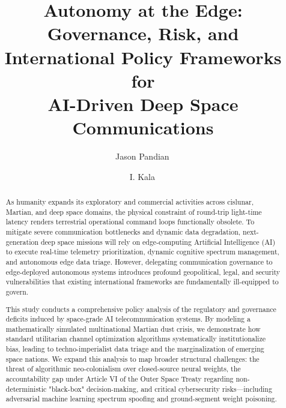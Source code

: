\documentclass[final,5p,times,twocolumn]{elsarticle}
\begin{document}
\begin{frontmatter}

\title{Autonomy at the Edge: Governance, Risk, and International Policy Frameworks for\\ AI-Driven Deep Space Communications}

\author[1]{Jason Pandian\,}

\author[2]{I. Kala\,}

\begin{abstract}
As humanity expands its exploratory and commercial activities across cislunar, Martian, and deep space domains, the physical constraint of round-trip light-time latency renders terrestrial operational command loops functionally obsolete. To mitigate severe communication bottlenecks and dynamic data degradation, next-generation deep space missions will rely on edge-computing Artificial Intelligence (AI) to execute real-time telemetry prioritization, dynamic cognitive spectrum management, and autonomous edge data triage. However, delegating communication governance to edge-deployed autonomous systems introduces profound geopolitical, legal, and security vulnerabilities that existing international frameworks are fundamentally ill-equipped to govern.

This study conducts a comprehensive policy analysis of the regulatory and governance deficits induced by space-grade AI telecommunication systems. By modeling a mathematically simulated multinational Martian dust crisis, we demonstrate how standard utilitarian channel optimization algorithms systematically institutionalize bias, leading to techno-imperialist data triage and the marginalization of emerging space nations. We expand this analysis to map broader structural challenges: the threat of algorithmic neo-colonialism over closed-source neural weights, the accountability gap under Article VI of the Outer Space Treaty regarding non-deterministic "black-box" decision-making, and critical cybersecurity risks—including adversarial machine learning spectrum spoofing and ground-segment weight poisoning.


\end{abstract}
\end{frontmatter}
\end{document}

